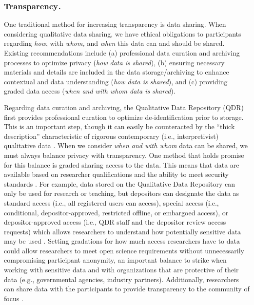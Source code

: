 \documentclass[authordate, meta, issue]{jote-new-article}
\begin{document}
\subsubsection{Transparency\emph{. }}



One traditional method for increasing transparency is data sharing. When considering qualitative data sharing, we have ethical obligations to participants regarding \emph{how}, with \emph{whom, }and \emph{when} this data can and should be shared. Existing recommendations include (a) professional data curation and archiving processes to optimize privacy (\emph{how data is shared}), (b) ensuring necessary materials and details are included in the data storage/archiving to enhance contextual and data understanding (\emph{how data is shared}), and (c) providing graded data access (\emph{when and with whom data is shared}).



Regarding data curation and archiving, the Qualitative Data Repository (QDR) first provides professional curation to optimize de-identification prior to storage. This is an important step, though it can easily be counteracted by the “thick description” characteristic of rigorous contemporary (i.e., interpretivist) qualitative data \parencites{Geertz1973}. When we consider \emph{when and with whom} data can be shared, we must always balance privacy with transparency. One method that holds promise for this balance is graded sharing access to the data. This means that data are available based on researcher qualifications \parencites[e.g.][]{ICPSRND} and the ability to meet security standards \parencites[e.g.][]{ICPSRND}{QualitativeDataRepository2022}. For example, data stored on the Qualitative Data Repository can only be used for research or teaching, but depositors can designate the data as standard access (i.e., all registered users can access), special access (i.e., conditional, depositor-approved, restricted offline, or embargoed access), or depositor-approved access (i.e., QDR staff and the depositor review access requests) which allows researchers to understand how potentially sensitive data may be used \parencites{AccessControls2020}. Setting gradations for how much access researchers have to data could allow researchers to meet open science requirements without unnecessarily compromising participant anonymity, an important balance to strike when working with sensitive data and with organizations that are protective of their data (e.g., governmental agencies, industry partners). Additionally, researchers can share data with the participants to provide transparency to the community of focus \parencites{Humphreys2021}.
\end{document}
